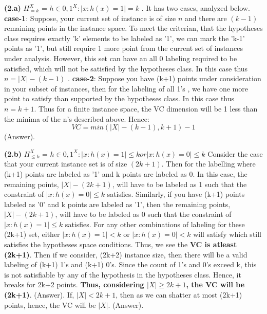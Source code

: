 \documentclass{article}
\renewcommand\part[1]{\vspace{.10in}\textbf{(#1)}}
\begin{document}
  \part{2.a} 
    $H_{=k}^X$ = ${h \in {0,1}^X : |{x:h(x)=1}| = k}$ . It has two cases, analyzed below. \newline
    \textbf {case-1}: Suppose, your current set of instance is of size $n$ and there are $(k-1)$ remaining points in the instance space. To meet the criterian, that the hypotheses class requires exactly 'k' elements to be labeled as '1', we can mark the 'k-1' points as '1', but still require 1 more point from the current set of instances under analysis. However, this set can have an all 0 labeling required to be satisfied, which will not be satisfied by the hypotheses class. In this case thus $n = |X| - (k-1)$ . \newline
    \textbf {case-2}: Suppose you have (k+1) points under consideration in your subset of instances, then for the labeling of all 1's , we have one more point to satisfy than supported by the hypotheses class. In this case thus $n = k+1$. Thus for a finite instance space, the VC dimension will be 1 less than the minima of the n's described above. Hence: \newline
    \[ VC = min(|X| - (k-1) , k+1) - 1\]
    (Answer).
    
    \part{2.b}
    $H_{\leq k}^X$ = ${ h \in {0,1}^X : |{x:h(x)=1}| \leq k or |{x:h(x)=0}| \leq k}$ \newline
    Consider the case that your current instance set is of size $(2k+1)$. Then for the labelling where (k+1) points are labeled as '1' and k points are labeled as 0. In this case, the remaining points, $|X|-(2k+1)$, will have to be labeled as 1 such that the constraint of $|{x:h(x)=0}| \leq k$ satisfies. Similarly, if you have (k+1) points labeled as '0' and k points are labeled as '1', then the remaining points, $|X| - (2k+1)$, will have to be labeled as 0 such that the constraint of $|{x:h(x)=1}| \leq k$ satisfies. For any other combinations of labeling for these (2k+1) set, either $|{x:h(x)=1}| < k$ or $|{x:h(x)=0}| < k$ will satisfy which still satisfies the hypotheses space conditions. Thus, we see the \textbf {VC is atleast (2k+1)}. Then if we consider, (2k+2) instance size, then there will be a valid labeling of (k+1) 1's and (k+1) 0's. Since the count of 1's and 0's exceed k, this is not satisfiable by any of the hypothesis in the hypotheses class. Hence, it breaks for 2k+2 points. \textbf {Thus, considering $|X| \geq 2k+1$, the VC will be (2k+1)}. (Answer). \newline
    If, $|X| < 2k+1$, then as we can shatter at most (2k+1) points, hence, the VC will be $|X|$. (Answer). \newline
\end{document}

